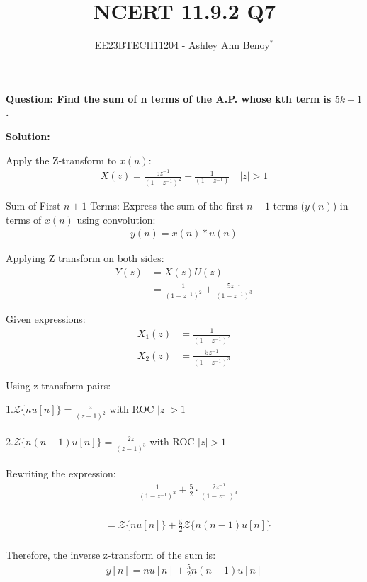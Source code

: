 \documentclass[journal,12pt,twocolumn]{IEEEtran}
\theoremstyle{remark}
\begin{document}

\vspace{3cm}

\title{NCERT 11.9.2  Q7}
\author{EE23BTECH11204 - Ashley Ann Benoy$^{*}$}%
\maketitle
\newpage
\bigskip

\renewcommand{\thefigure}{\theenumi}
\renewcommand{\thetable}{\theenumi}



\textbf{Question: Find the sum of n terms of the A.P. whose kth term is \(5k + 1\).}

\textbf{Solution:}


Apply the Z-transform to \( x(n) \):
\begin{align}
X(z) = \frac{5z^{-1}}{(1 - z^{-1})^2} + \frac{1}{(1 - z^{-1})}
\quad |z|>1
\end{align}

Sum of First \( n+1 \) Terms:
Express the sum of the first \( n+1 \) terms (\( y(n) \)) in terms of \( x(n) \) using convolution:
\begin{align}
y(n) = x(n) * u(n)
\end{align}

Applying Z transform on both sides:
\begin{align}
    Y(z) &= X(z)U(z)\\
    &=\frac{1}{(1-z^{-1})^2} + \frac{5z^{-1}}{(1-z^{-1})^3}
\end{align}

Given expressions:
\begin{align}
    X_1(z) &= \frac{1}{{(1 - z^{-1})^2}} \\
    X_2(z) &= \frac{5z^{-1}}{{(1 - z^{-1})^3}} \label{eq:x2z}
\end{align}

Using z-transform pairs:

1.\( \mathcal{Z}\{n u[n]\} = \frac{z}{(z-1)^2} \) with ROC \( |z| > 1 \)
\\\\
2.\( \mathcal{Z}\{n(n-1) u[n]\} = \frac{2z}{(z-1)^3} \) with ROC \( |z| > 1 \)
\\\\

Rewriting the expression:
\begin{align}
&\frac{1}{(1 - z^{-1})^2} + \frac{5}{2} \cdot \frac{2z^{-1}}{(1 - z^{-1})^3} 
\end{align}
\\
\begin{align}
&= \mathcal{Z}\{n u[n]\} + \frac{5}{2} \mathcal{Z}\{n(n-1) u[n]\}
\end{align}
\\
Therefore, the inverse z-transform of the sum is:
\begin{align}
y[n] = n u[n] + \frac{5}{2} n(n-1) u[n]
\end{align}
\end{document}
